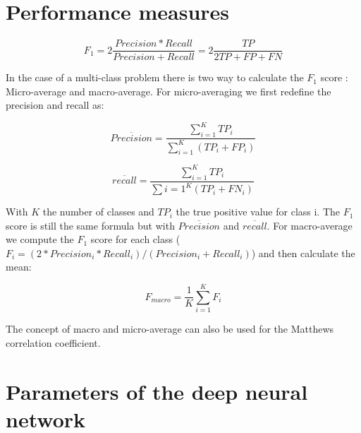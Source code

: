 \documentclass[a4paper,12pt]{article}
\numberwithin{equation}{section}
\begin{document}
\newpage
\begin{appendices}

\section{Performance measures}

\begin{equation*}
F_1 = 2\frac{Precision*Recall}{Precision + Recall} = 2\frac{TP}{2TP+FP+FN}
\end{equation*} 

In the case of a multi-class problem there is two way to calculate the $F_1$ score : Micro-average and macro-average. For micro-averaging we first redefine the precision and recall as:

\begin{equation*}
\overline{Precision} = \frac{\sum_{i=1}^K TP_i}{\sum_{i=1}^K(TP_i+FP_i)}
\end{equation*} 

\begin{equation*}
\overline{recall} = \frac{\sum_{i=1}^KTP_i}{\sum{i=1}^K(TP_i + FN_i)}
\end{equation*}

With $K$ the number of classes and $TP_i$ the true positive value for class i. The $F_1$ score is still the same formula but with $\overline{Precision}$  and $\overline{recall}$. For macro-average we compute the $F_1$ score for each  class ($F_i = (2*Precision_i*Recall_i)/(Precision_i + Recall_i)$)  and then calculate the mean:

\begin{equation*}
F_{macro}= \frac{1}{K}\sum_{i=1}^K F_i
\end{equation*}

The concept of macro and micro-average can also be used for the Matthews correlation coefficient.

\newpage
\section{Parameters of the deep neural network}



\end{appendices}
\end{document}
